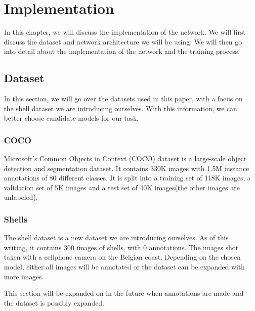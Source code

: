  
\chapter{Implementation}
In this chapter, we will discuss the implementation of the network. We will first discuss the dataset and network architecture we will be using. We will then go into detail about the implementation of the network and the training process. 

\section{Dataset}
In this section, we will go over the datasets used in this paper, with a focus on the shell dataset we are introducing ourselves. With this information, we can better choose candidate models for our task.

\subsection{COCO}

Microsoft's Common Objects in Context (COCO) dataset is a large-scale object detection and segmentation dataset. It contains 330K images with 1.5M instance annotations of 80 different classes. It is split into a training set of 118K images, a validation set of 5K images and a test set of 40K images(the other images are unlabeled). \citet{COCO}

\subsection{Shells}

The shell dataset is a new dataset we are introducing ourselves. As of this writing, it contains 300 images of shells, with 0 annotations. The images shot taken with a cellphone camera on the Belgian coast. Depending on the chosen model, either all images will be annotated or the dataset can be expanded with more images.

This section will be expanded on in the future when annotations are made and the dataset is possibly expanded.
